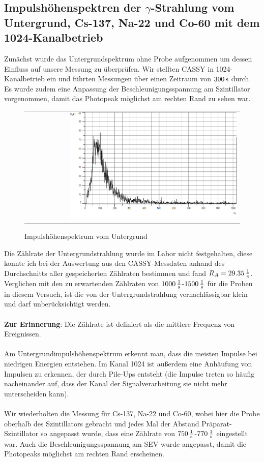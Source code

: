 \documentclass[a4paper,titlepage]{scrartcl}
\numberwithin{equation}{section}
\begin{document}
\subsection{Impulshöhenspektren der $\gamma$-Strahlung vom Untergrund, Cs-137, Na-22 und Co-60 mit dem 1024-Kanalbetrieb}
Zunächst wurde das Untergrundspektrum ohne Probe aufgenommen um dessen Einfluss auf unsere Messung zu überprüfen. Wir stellten CASSY in 1024-Kanalbetrieb ein und führten Messungen über einen Zeitraum von $\unit[300]{s}$ durch. Es wurde zudem eine Anpassung der Beschleunigungsspannung am Szintillator vorgenommen, damit das Photopeak möglichst am rechten Rand zu sehen war.
\begin{figure}[H]
		\centering
		\begin{tabular}{@{}r@{}}
			\includegraphics[width=0.8\textwidth]{bilder/aufgabe1/untegrundspektrum.png}\\
		\end{tabular}
		\caption{Impulshöhenspektrum vom Untergrund}
\end{figure}
Die Zählrate der Untergrundstrahlung wurde im Labor nicht festgehalten, diese konnte ich bei der Auswertung aus den CASSY-Messdaten anhand des Durchschnitts aller gespeicherten Zählraten bestimmen und fand $R_A=\unit[29.35]{\frac{1}{s}}$. Verglichen mit den zu erwartenden Zählraten von $\unit[1000]{\frac{1}{s}}$-$\unit[1500]{\frac{1}{s}}$ für die Proben in diesem Versuch, ist die von der Untergrundstrahlung vernachlässigbar klein und darf unberücksichtigt werden.\\ \\
\textbf{Zur Erinnerung}: Die Zählrate ist definiert als die mittlere Frequenz von Ereignissen.\\ \\
Am Untergrundimpulshöhenspektrum erkennt man, dass die meisten Impulse bei niedrigen Energien entstehen. Im Kanal 1024 ist außerdem eine Anhäufung von Impulsen zu erkennen, der durch Pile-Ups entsteht (die Impulse treten so häufig nacheinander auf, dass der Kanal der Signalverarbeitung sie nicht mehr unterscheiden kann).\\ \\
Wir wiederholten die Messung für Cs-137, Na-22 und Co-60, wobei hier die Probe oberhalb des Szintillators gebracht und jedes Mal der Abstand Präparat-Szintillator so angepasst wurde, dass eine Zählrate von $\unit[750]{\frac{1}{s}}$-$\unit[770]{\frac{1}{s}}$ eingestellt war. Auch die Beschleunigungsspannung am SEV wurde angepasst, damit die Photopeaks möglichst am rechten Rand erscheinen.
\end{document}
